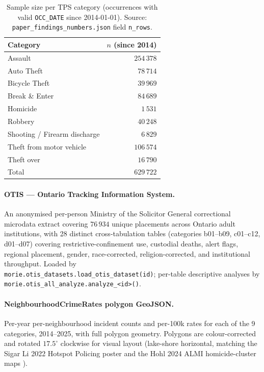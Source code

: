 \documentclass[11pt,a4paper]{article}
\newcommand{\1}{\mathbf{1}}
\theoremstyle{plain}
\theoremstyle{definition}
\begin{document}
\begin{table}[h]
\centering\small
\caption{Sample size per TPS category (occurrences with valid
\texttt{OCC\_DATE} since 2014-01-01).  Source:
\texttt{paper\_findings\_numbers.json} field \texttt{n\_rows}.}
\label{tab:n_per_cat}
\begin{tabular}{lr}
\toprule
Category & $n$ (since 2014)\\\midrule
Assault                       & $254\,378$\\
Auto Theft                    & $\phantom{0}78\,714$\\
Bicycle Theft                 & $\phantom{0}39\,969$\\
Break \& Enter                & $\phantom{0}84\,689$\\
Homicide                      & $\phantom{00}1\,531$\\
Robbery                       & $\phantom{0}40\,248$\\
Shooting / Firearm discharge  & $\phantom{00}6\,829$\\
Theft from motor vehicle      & $106\,574$\\
Theft over                    & $\phantom{0}16\,790$\\\midrule
Total                         & $629\,722$\\
\bottomrule
\end{tabular}
\end{table}

\paragraph{OTIS — Ontario Tracking Information System.}  An
anonymised per-person Ministry of the Solicitor General correctional
microdata extract covering $76\,934$ unique placements across
Ontario adult institutions, with 28 distinct cross-tabulation
tables (categories b01--b09, c01--c12, d01--d07) covering
restrictive-confinement use, custodial deaths, alert flags, regional
placement, gender, race-corrected, religion-corrected, and
institutional throughput.  Loaded by\\
\texttt{morie.otis\_datasets.load\_otis\_dataset(id)};
per-table descriptive analyses by\\
\texttt{morie.otis\_all\_analyze.analyze\_<id>()}.

\paragraph{NeighbourhoodCrimeRates polygon GeoJSON.}  Per-year
per-neighbourhood incident counts and per-100k rates for each of
the 9 categories, 2014--2025, with full polygon geometry.  Polygons
are colour-corrected and rotated $17.5^{\circ}$ clockwise for
visual layout (lake-shore horizontal, matching the Sigar Li 2022
Hotspot Policing poster and the Hohl 2024 ALMI homicide-cluster
maps \cite{hohl2024almi}).
\end{document}

